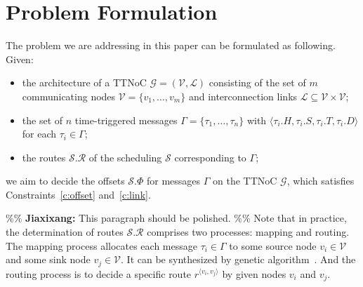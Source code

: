 \documentclass[journal]{IEEEtran}
\newcommand{\calG}{\mathcal{G}}
\newcommand{\calV}{\mathcal{V}}
\newcommand{\calL}{\mathcal{L}}
\newcommand{\calS}{\mathcal{S}}
\newcommand{\calR}{\mathcal{R}}
\newcommand{\route}[3]{#1^{\langle #2,#3\rangle}}
\theoremstyle{remark}
\newcommand{\jx}[1]{\%\% \textbf{Jiaxixang: }#1 \%\%\xspace}
\begin{document}
\section{Problem Formulation\label{s:formulation}}
The problem we are addressing in this paper can be formulated as
following. Given:
\begin{itemize}
\item the architecture of a TTNoC $\calG=(\calV,\calL)$ consisting of
  the set of $m$ communicating nodes $\calV=\{v_{1},\dots,v_{m}\}$ and
  interconnection links $\calL \subseteq \calV \times \calV$;
\item the set of $n$ time-triggered messages $\Gamma =
  \{\tau_{1},\dots,\tau_{n} \}$ with $\langle \tau_{i}.H,\tau_{i}.S,
  \tau_{i}.T, \tau_{i}.D\rangle$ for each $\tau_i \in \Gamma$;
\item the routes $\calS.\calR$ of the scheduling $\calS$ corresponding
  to $\Gamma$;
\end{itemize}
we aim to decide the offsets $\calS.\Phi$ for messages $\Gamma$ on the
TTNoC $\calG$, which satisfies Constraints~\ref{c:offset}
and~\ref{c:link}.

\jx{This paragraph should be polished.}
Note that in practice, the determination of routes $\calS.\calR$
comprises two processes: mapping and routing. 
The mapping process
allocates each message $\tau_i\in\Gamma$ to some source node
$v_i\in\calV$ and some sink node $v_j\in\calV$. 
It can be synthesized
by genetic algorithm~\cite{DBLP:conf/recosoc/MesidisI11}.  
And the
routing process is to decide a specific route $\route{r}{v_i}{v_j}$ by
given nodes $v_i$ and $v_j$.

\end{document}
